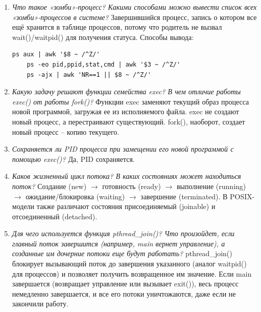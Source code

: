 \begin{enumerate}
	wait() и waitpid() приостанавливают родительский процесс до завершения дочернего и позволяют получить статус его завершения.
	wait() ждет любого потомка, waitpid() -- конкретного (или группы).
	Если родитель завершается раньше потомка, потомок становится сиротой (orphan) и усыновляется процессом init (PID=1) или подсистемой systemd, которая затем вызывает wait() для получения статуса.
	\item \textit{Что такое «зомби»-процесс? Какими способами можно вывести список всех «зомби»-процессов в системе?}
	Завершившийся процесс, запись о котором все ещё хранится в таблице процессов, потому что родитель не вызвал wait()/waitpid() для получения статуса.
	Способы вывода:
	\begin{Verbatim}[xleftmargin=-2cm]
	ps aux | awk '$8 ~ /^Z/'
	ps -eo pid,ppid,stat,cmd | awk '$3 ~ /^Z/'
	ps -ajx | awk 'NR==1 || $8 ~ /^Z/'
	\end{Verbatim}
	\item \textit{Какую задачу решают функции семейства exec? В чем отличие работы exec() от работы fork()?}\newline 
	Функции exec заменяют текущий образ процесса новой программой, загружая ее из исполняемого файла.
	exec не создают новый процесс, а перестраивают существующий. fork(), наоборот, создает новый процесс -- копию текущего.
	\item \textit{Сохраняется ли PID процесса при замещении его новой программой с помощью exec()?}\newline 
	Да, PID сохраняется.
	\item \textit{Каков жизненный цикл потока? В каких состояниях может находиться поток?}\newline 
	Создание (new) 
	$\to$ готовность (ready) 
	$\to$ выполнение (running) 
	$\to$ ожидание/блокировка (waiting) 
	$\to$ завершение (terminated). 
	В POSIX-модели также различают состояния присоединяемый (joinable) и отсоединенный (detached).
	\item \textit{Для чего используется функция pthread\_join()? Что произойдет, если главный поток завершится (например, main вернет управление), а созданные им дочерние потоки еще будут работать?}\newline 
	pthread\_join() блокирует вызывающий поток до завершения указанного (аналог waitpid() для процессов) и позволяет получить возвращенное им значение. 
	Если main завершается (возвращает управление или вызывает exit()), весь процесс немедленно завершается, и все его потоки уничтожаются, даже если не закончили работу.
\end{enumerate}
